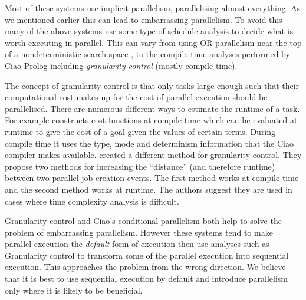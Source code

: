 Most of these systems use implicit parallelism, parallelising almost
everything.
As we mentioned earlier this can lead to embarrassing parallelism.
To avoid this many of the above systems use some type of schedule analysis
to decide what is worth executing in parallel.
This can vary from using OR-parallelism near the top of a nondeterministic
search space \citep{hausman:1987:or},
to the compile time analyses performed by Ciao Prolog
\citep{hermenegildo_ciao} including \emph{granularity control} 
\citep{lopez96:distance_granularity} (mostly compile time).

The concept of granularity control
\citep{debray:1990:granularity} is that only tasks
large enough such that their computational cost makes up for the cost of
parallel execution should be parallelised.
There are numerous different ways to estimate the runtime of a task.
For example \citet{lopez96:distance_granularity} constructs cost functions
at compile time which can be evaluated at runtime to give the cost of a
goal given the values of certain terms.
During compile time it uses the type, mode and determinism information that
the Ciao compiler makes available.
\citet{shen_98_granularity-control} created a different method for
granularity control.
They propose two methods for increasing the ``distance''
(and therefore runtime)
between two parallel job creation events.
The first method works at compile time and the second method works at
runtime.
The authors suggest they are used in cases where time complexity
analysis is difficult.

Granularity control and Ciao's conditional parallelism both help to
solve the problem of embarrassing parallelism.
However these systems tend to make parallel execution the \emph{default}
form of execution then use analyses such as Granularity control to
transform some of the parallel execution into sequential execution.
This approaches the problem from the wrong direction.
We believe that it is best to use sequential execution by default and
introduce parallelism only where it is likely to be beneficial.

